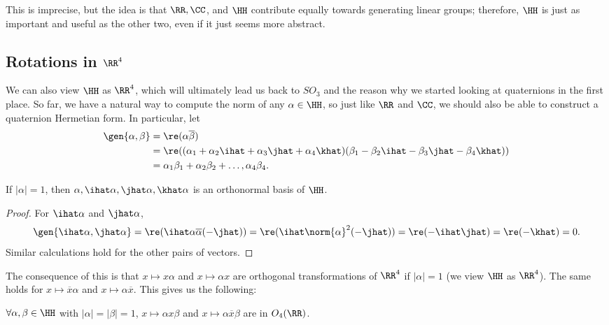 This is imprecise, but the idea is that $\RR, \CC$, and $\HH$ contribute equally towards generating linear groups; therefore, $\HH$ is just as important and useful as the other two, even if it just seems more abstract. 

\subsection{Rotations in $\RR^4$}

We can also view $\HH$ as $\RR^4$, which will ultimately lead us back to $SO_3$ and the reason why we started looking at quaternions in the first place.
So far, we have a natural way to compute the norm of any $\alpha\in \HH$, so just like $\RR$ and $\CC$, we should also be able to construct a quaternion Hermetian form. In particular, let
 \begin{align*}
 \gen{\alpha, \beta} &= \re ({\alpha\overline{\beta}}) \\
     &= \re ({(\alpha_1 + \alpha_2\ihat + \alpha_3\jhat + \alpha_4\khat) (\beta_1 - \beta_2\ihat - \beta_3\jhat - \beta_4\khat)}) \\
     &= \alpha_1\beta_1 + \alpha_2\beta_2 + \hdots, \alpha_4\beta_4.
 \end{align*}

\begin{theorem}
\proplabel

If $\vert\alpha\vert = 1$, then $\alpha, \ihat \alpha, \jhat \alpha, \khat \alpha$ is an orthonormal basis of $\HH$. 
\end{theorem}

\begin{proof}

For $\ihat\alpha$ and $\jhat\alpha$,
\[\gen{\ihat\alpha, \jhat\alpha} = \re (\ihat\alpha \overline{\alpha}(-\jhat)) = \re (\ihat \norm{\alpha}^2(-\jhat)) = \re(-\ihat\jhat) = \re(-\khat) = 0.\]
Similar calculations hold for the other pairs of vectors. 
\end{proof}

The consequence of this is that $x\mapsto x\alpha$ and $x\mapsto \alpha x$ are orthogonal transformations of $\RR^4$ if $\vert\alpha\vert = 1$ (we view $\HH$ as $\RR^4$). The same holds for $x\mapsto \overline{x}\alpha$ and $x\mapsto \alpha\overline{x}$. This gives us the following:

\begin{theorem}
\thmlabel

$\forall \alpha, \beta\in \HH$ with $\vert\alpha\vert = \vert\beta\vert = 1$, $x\mapsto \alpha x\beta$ and $x\mapsto \alpha\overline{x}\beta$ are in $O_4(\RR)$. 
\end{theorem}

